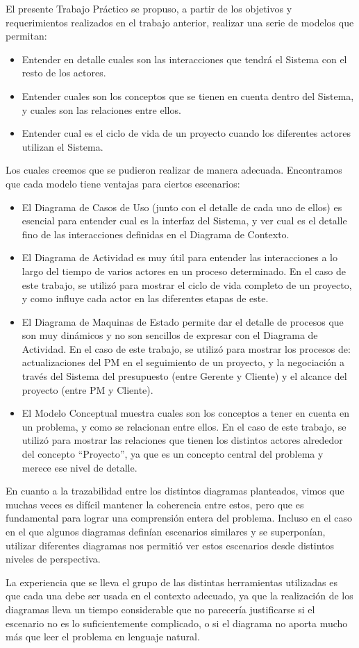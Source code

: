 El presente Trabajo Práctico se propuso, a partir de los objetivos y requerimientos realizados en el trabajo anterior,
realizar una serie de modelos que permitan:

\begin{itemize}
	\item Entender en detalle cuales son las interacciones que tendrá el Sistema con el resto de los actores.
	\item Entender cuales son los conceptos que se tienen en cuenta dentro del Sistema, y cuales son las relaciones entre ellos.
	\item Entender cual es el ciclo de vida de un proyecto cuando los diferentes actores utilizan el Sistema.
\end{itemize}

Los cuales creemos que se pudieron realizar de manera adecuada. Encontramos que cada modelo tiene ventajas para ciertos escenarios:
\begin{itemize}
	\item El Diagrama de Casos de Uso (junto con el detalle de cada uno de ellos) es esencial para entender cual es la interfaz del Sistema, y ver cual es el detalle fino de las interacciones definidas en el Diagrama de Contexto.
	\item El Diagrama de Actividad es muy útil para entender las interacciones a lo largo del tiempo de varios actores en un proceso determinado. En el caso de este trabajo, se utilizó para mostrar el ciclo de vida completo de un proyecto, y como influye cada actor en las diferentes etapas de este.
	\item El Diagrama de Maquinas de Estado permite dar el detalle de procesos que son muy dinámicos y no son sencillos de expresar con el Diagrama de Actividad. En el caso de este trabajo, se utilizó para mostrar los procesos de: actualizaciones del PM en el seguimiento de un proyecto, y la negociación a través del Sistema del presupuesto (entre Gerente y Cliente) y el alcance del proyecto (entre PM y Cliente).
	\item El Modelo Conceptual muestra cuales son los conceptos a tener en cuenta en un problema, y como se relacionan entre ellos. En el caso de este trabajo, se utilizó para mostrar las relaciones que tienen los distintos actores alrededor del concepto ``Proyecto'', ya que es un concepto central del problema y merece ese nivel de detalle.
\end{itemize}

En cuanto a la trazabilidad entre los distintos diagramas planteados, vimos que muchas veces es difícil mantener la coherencia entre estos, pero que es fundamental para lograr una comprensión entera del problema. Incluso en el caso en el que algunos diagramas definían escenarios similares y se superponían, utilizar diferentes diagramas nos permitió ver estos escenarios desde distintos niveles de perspectiva.

La experiencia que se lleva el grupo de las distintas herramientas utilizadas es que cada una debe ser usada en el contexto adecuado, ya que la realización de los diagramas lleva un tiempo considerable que no parecería justificarse si el escenario no es lo suficientemente complicado, o si el diagrama no aporta mucho más que leer el problema en lenguaje natural.
